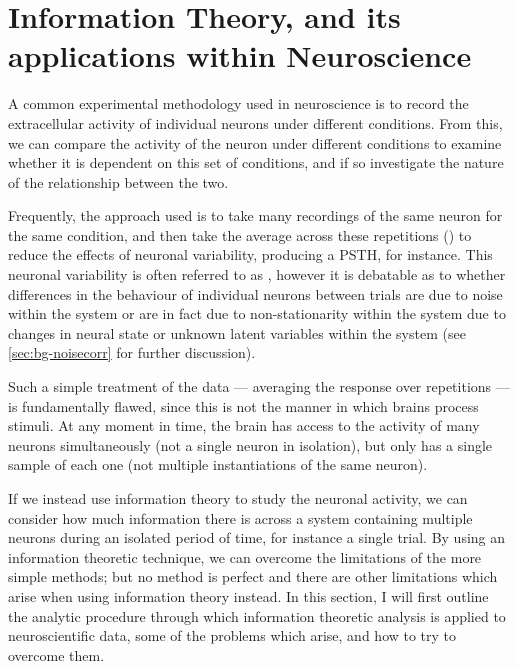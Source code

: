 \section{Information Theory, and its applications within Neuroscience}
\label{sec:bgit}

A common experimental methodology used in neuroscience is to record the extracellular activity of individual neurons under different conditions.
From this, we can compare the activity of the neuron under different conditions to examine whether it is dependent on this set of conditions, and if so investigate the nature of the relationship between the two.

Frequently, the approach used is to take many recordings of the same neuron for the same condition, and then take the average across these repetitions () to reduce the effects of neuronal variability, producing a \ac{PSTH}, for instance.
This neuronal variability is often referred to as , however it is debatable as to whether differences in the behaviour of individual neurons between trials are due to noise within the system or are in fact due to non-stationarity within the system due to changes in neural state or unknown latent variables within the system (see \autoref{sec:bg-noisecorr} for further discussion).

Such a simple treatment of the data --- averaging the response over repetitions --- is fundamentally flawed, since this is not the manner in which brains process stimuli.
At any moment in time, the brain has access to the activity of many neurons simultaneously (not a single neuron in isolation), but only has a single sample of each one (not multiple instantiations of the same neuron).

If we instead use information theory to study the neuronal activity, we can consider how much information there is across a system containing multiple neurons during an isolated period of time, for instance a single trial.
By using an information theoretic technique, we can overcome the limitations of the more simple methods; but no method is perfect and there are other limitations which arise when using information theory instead.
In this section, I will first outline the analytic procedure through which information theoretic analysis is applied to neuroscientific data, some of the problems which arise, and how to try to overcome them.


